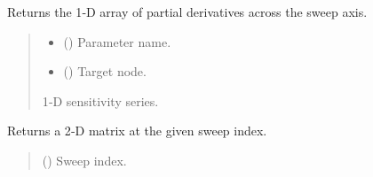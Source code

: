 \documentclass[letterpaper,10pt,english]{sphinxmanual}
\begin{document}
\begin{fulllineitems}
\begin{fulllineitems}
\label{\detokenize{results:SensitivityData.get_sweep_series}}
\pysigstartsignatures
\pysiglinewithargsret
{}
{\sphinxparamcomma {}}
{}
\pysigstopsignatures
\sphinxAtStartPar
Returns the 1‑D array of partial derivatives  across the sweep axis.
\begin{quote}\begin{description}
\begin{itemize}
\item {} 
\sphinxAtStartPar
{} () \textendash{} Parameter name.

\item {} 
\sphinxAtStartPar
{} (\sphinxstyleliteralemphasis{\sphinxupquote{|}}) \textendash{} Target node.

\end{itemize}

\sphinxAtStartPar
{} \textendash{} 1‑D sensitivity series.

\end{description}\end{quote}

\end{fulllineitems}


\begin{fulllineitems}
\label{\detokenize{results:SensitivityData.get_matrix_at_step}}
\pysigstartsignatures
\pysiglinewithargsret
{}
{}
{}
\pysigstopsignatures
\sphinxAtStartPar
Returns a 2‑D matrix  at the given sweep index.
\begin{quote}\begin{description}
\sphinxAtStartPar
{} () \textendash{} Sweep index.


\end{description}
\end{quote}
\end{fulllineitems}
\end{fulllineitems}
\end{document}
